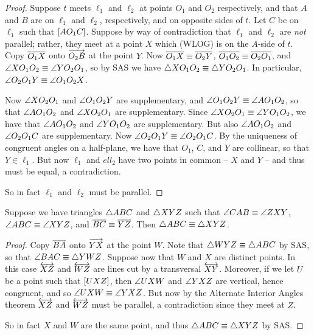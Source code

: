 \begin{proof}
Suppose \(t\) meets \(\ell_1\) and \(\ell_2\) at points \(O_1\) and \(O_2\) respectively, and that \(A\) and \(B\) are on \(\ell_1\) and \(\ell_2\), respectively, and on opposite sides of \(t\). Let \(C\) be on \(\ell_1\) such that \([ A O_1 C ]\). Suppose by way of contradiction that \(\ell_1\) and \(\ell_2\) are \emph{not} parallel; rather, they meet at a point \(X\) which (WLOG) is on the \(A\)-side of \(t\). Copy \(\overline{O_1X}\) onto \(\overrightarrow{O_2B}\) at the point \(Y\). Now \(\overline{O_1X} \equiv \overline{O_2Y}\), \(\overline{O_1O_2} \equiv \overline{O_2O_1}\), and \(\angle{XO_1O_2} \equiv \angle{YO_2O_1}\), so by SAS we have \(\bigtriangleup{XO_1O_2} \equiv \bigtriangleup{YO_2O_1}\). In particular, \(\angle{O_2O_1Y} \equiv \angle{O_1O_2X}\).

Now \(\angle{XO_2O_1}\) and \(\angle{O_1O_2Y}\) are supplementary, and \(\angle{O_1O_2Y} \equiv \angle{AO_1O_2}\), so that \(\angle{AO_1O_2}\) and \(\angle{XO_2O_1}\) are supplementary. Since \(\angle{XO_2O_1} \equiv \angle{YO_1O_2}\), we have that \(\angle{AO_1O_2}\) and \(\angle{YO_1O_2}\) are supplementary. But also \(\angle{AO_1O_2}\) and \(\angle{O_2O_1C}\) are supplementary. Now \(\angle{O_2O_1Y} \equiv \angle{O_2O_1C}\). By the uniqueness of congruent angles on a half-plane, we have that \(O_1\), \(C\), and \(Y\) are collinear, so that \(Y \in \ell_1\). But now \(\ell_1\) and \(ell_2\) have two points in common -- \(X\) and \(Y\) -- and thus must be equal, a contradiction.

So in fact \(\ell_1\) and \(\ell_2\) must be parallel.  
\end{proof}

\begin{prop}[AAS]
Suppose we have triangles \(\bigtriangleup{ABC}\) and \(\bigtriangleup{XYZ}\) such that \(\angle{CAB} \equiv \angle{ZXY}\), \(\angle{ABC} \equiv \angle{XYZ}\), and \(\overline{BC} \equiv \overline{YZ}\). Then \(\bigtriangleup{ABC} \equiv \bigtriangleup{XYZ}\).
\end{prop}

\begin{proof}
Copy \(\overline{BA}\) onto \(\overrightarrow{YX}\) at the point \(W\). Note that \(\bigtriangleup{WYZ} \equiv \bigtriangleup{ABC}\) by SAS, so that \(\angle{BAC} \equiv \bigtriangleup{YWZ}\). Suppose now that \(W\) and \(X\) are distinct points. In this case \(\overleftrightarrow{XZ}\) and \(\overleftrightarrow{WZ}\) are lines cut by a transversal \(\overleftrightarrow{XY}\). Moreover, if we let \(U\) be a point such that \([ U X Z ]\), then \(\angle{UXW}\) and \(\angle{YXZ}\) are vertical, hence congruent, and so \(\angle{UXW} \equiv \angle{YXZ}\). But now by the Alternate Interior Angles theorem \(\overleftrightarrow{XZ}\) and \(\overleftrightarrow{WZ}\) must be parallel, a contradiction since they meet at \(Z\).

So in fact \(X\) and \(W\) are the same point, and thus \(\bigtriangleup{ABC} \equiv \bigtriangleup{XYZ}\) by SAS.
\end{proof}

